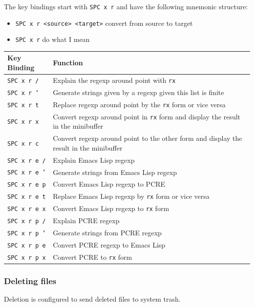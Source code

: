 \documentclass[11pt]{article}
\begin{document}
The key bindings start with \texttt{SPC x r} and have the following mnemonic structure:

\begin{itemize}
\item \texttt{SPC x r <source> <target>} convert from source to target
\item \texttt{SPC x r} do what I mean
\end{itemize}

\begin{center}
\begin{tabular}{ll}
Key Binding & Function\\
\hline
\texttt{SPC x r /} & Explain the regexp around point with \texttt{rx}\\
\texttt{SPC x r '​} & Generate strings given by a regexp given this list is finite\\
\texttt{SPC x r t} & Replace regexp around point by the \texttt{rx} form or vice versa\\
\texttt{SPC x r x} & Convert regexp around point in \texttt{rx} form  and display the result in the minibuffer\\
\texttt{SPC x r c} & Convert regexp around point to the other form and display the result in the minibuffer\\
\texttt{SPC x r e /} & Explain Emacs Lisp regexp\\
\texttt{SPC x r e '​} & Generate strings from Emacs Lisp regexp\\
\texttt{SPC x r e p} & Convert Emacs Lisp regexp to PCRE\\
\texttt{SPC x r e t} & Replace Emacs Lisp regexp by \texttt{rx} form or vice versa\\
\texttt{SPC x r e x} & Convert Emacs Lisp regexp to \texttt{rx} form\\
\texttt{SPC x r p /} & Explain PCRE regexp\\
\texttt{SPC x r p '​} & Generate strings from PCRE regexp\\
\texttt{SPC x r p e} & Convert PCRE regexp to Emacs Lisp\\
\texttt{SPC x r p x} & Convert PCRE to \texttt{rx} form\\
\end{tabular}
\end{center}

\subsubsection{Deleting files}
\label{sec:org86a6623}
Deletion is configured to send deleted files to system trash.
\end{document}

